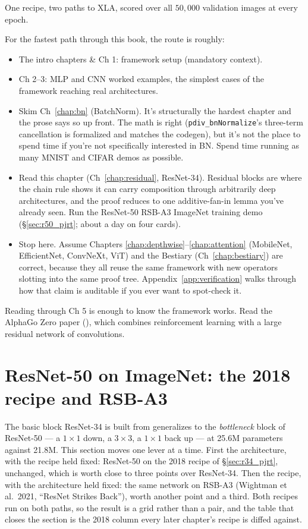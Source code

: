 \noindent One recipe, two paths to XLA, scored over all $50{,}000$
validation images at every epoch.


For the fastest path through this book, the route is roughly:

\begin{itemize}
  \item The intro chapters \& Ch 1: framework setup (mandatory context).
  \item Ch 2--3: MLP and CNN worked examples, the simplest cases
    of the framework reaching real architectures.
  \item Skim Ch~\ref{chap:bn} (BatchNorm). It's structurally the
    hardest chapter and the prose says so up front. The math is
    right (\texttt{pdiv\_bnNormalize}'s three-term cancellation is
    formalized and matches the codegen), but it's not the place to
    spend time if you're not specifically interested in BN. Spend
    time running as many MNIST and CIFAR demos as possible.
  \item Read this chapter (Ch~\ref{chap:residual}, ResNet-34).
    Residual blocks are where the chain rule shows it can carry
    composition through arbitrarily deep architectures, and the proof
    reduces to one additive-fan-in lemma you've already seen. Run
    the ResNet-50 RSB-A3 ImageNet training demo
    (\S\ref{sec:r50_pjrt}; about a day on four cards).
  \item Stop here. Assume Chapters \ref{chap:depthwise}--\ref{chap:attention}
    (MobileNet, EfficientNet, ConvNeXt, ViT) and the Bestiary
    (Ch~\ref{chap:bestiary}) are correct, because they all reuse the
    same framework with new operators slotting into the same proof
    tree. Appendix~\ref{app:verification} walks through how that
    claim is auditable if you ever want to spot-check it.
\end{itemize}

Reading through Ch 5 is enough to know the framework works. Read
the AlphaGo Zero paper
(), which combines
reinforcement learning with a large residual network of
convolutions.

\section{ResNet-50 on ImageNet: the 2018 recipe and RSB-A3}

The basic block ResNet-34 is built from generalizes to the
\emph{bottleneck} block of ResNet-50 --- a $1\times1$ down, a $3\times3$, a
$1\times1$ back up --- at 25.6M parameters against 21.8M. This section
moves one lever at a time. First the architecture, with the recipe held
fixed: ResNet-50 on the 2018 recipe of \S\ref{sec:r34_pjrt}, unchanged,
which is worth close to three points over ResNet-34. Then the recipe, with
the architecture held fixed: the same network on RSB-A3 (Wightman et al.\
2021, ``ResNet Strikes Back''), worth another point and a third. Both
recipes run on both paths, so the result is a grid rather than a pair, and
the table that closes the section is the 2018 column every later chapter's
recipe is diffed against.

